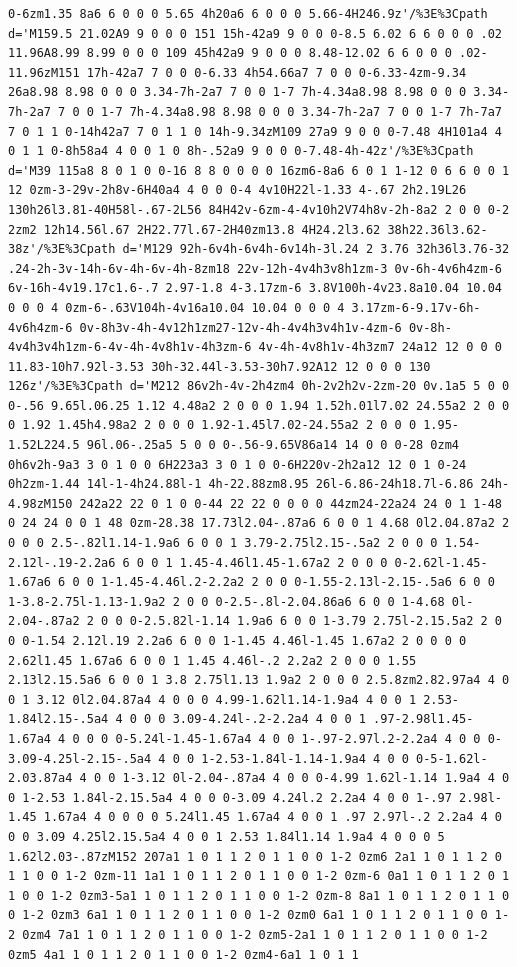 \documentclass[11pt]{article}
\begin{document}
\begin{enumerate}
\begin{verbatim}
0-6zm1.35 8a6 6 0 0 0 5.65 4h20a6 6 0 0 0 5.66-4H246.9z'/%3E%3Cpath d='M159.5 21.02A9 9 0 0 0 151 15h-42a9 9 0 0 0-8.5 6.02 6 6 0 0 0 .02 11.96A8.99 8.99 0 0 0 109 45h42a9 9 0 0 0 8.48-12.02 6 6 0 0 0 .02-11.96zM151 17h-42a7 7 0 0 0-6.33 4h54.66a7 7 0 0 0-6.33-4zm-9.34 26a8.98 8.98 0 0 0 3.34-7h-2a7 7 0 0 1-7 7h-4.34a8.98 8.98 0 0 0 3.34-7h-2a7 7 0 0 1-7 7h-4.34a8.98 8.98 0 0 0 3.34-7h-2a7 7 0 0 1-7 7h-7a7 7 0 1 1 0-14h42a7 7 0 1 1 0 14h-9.34zM109 27a9 9 0 0 0-7.48 4H101a4 4 0 1 1 0-8h58a4 4 0 0 1 0 8h-.52a9 9 0 0 0-7.48-4h-42z'/%3E%3Cpath d='M39 115a8 8 0 1 0 0-16 8 8 0 0 0 0 16zm6-8a6 6 0 1 1-12 0 6 6 0 0 1 12 0zm-3-29v-2h8v-6H40a4 4 0 0 0-4 4v10H22l-1.33 4-.67 2h2.19L26 130h26l3.81-40H58l-.67-2L56 84H42v-6zm-4-4v10h2V74h8v-2h-8a2 2 0 0 0-2 2zm2 12h14.56l.67 2H22.77l.67-2H40zm13.8 4H24.2l3.62 38h22.36l3.62-38z'/%3E%3Cpath d='M129 92h-6v4h-6v4h-6v14h-3l.24 2 3.76 32h36l3.76-32 .24-2h-3v-14h-6v-4h-6v-4h-8zm18 22v-12h-4v4h3v8h1zm-3 0v-6h-4v6h4zm-6 6v-16h-4v19.17c1.6-.7 2.97-1.8 4-3.17zm-6 3.8V100h-4v23.8a10.04 10.04 0 0 0 4 0zm-6-.63V104h-4v16a10.04 10.04 0 0 0 4 3.17zm-6-9.17v-6h-4v6h4zm-6 0v-8h3v-4h-4v12h1zm27-12v-4h-4v4h3v4h1v-4zm-6 0v-8h-4v4h3v4h1zm-6-4v-4h-4v8h1v-4h3zm-6 4v-4h-4v8h1v-4h3zm7 24a12 12 0 0 0 11.83-10h7.92l-3.53 30h-32.44l-3.53-30h7.92A12 12 0 0 0 130 126z'/%3E%3Cpath d='M212 86v2h-4v-2h4zm4 0h-2v2h2v-2zm-20 0v.1a5 5 0 0 0-.56 9.65l.06.25 1.12 4.48a2 2 0 0 0 1.94 1.52h.01l7.02 24.55a2 2 0 0 0 1.92 1.45h4.98a2 2 0 0 0 1.92-1.45l7.02-24.55a2 2 0 0 0 1.95-1.52L224.5 96l.06-.25a5 5 0 0 0-.56-9.65V86a14 14 0 0 0-28 0zm4 0h6v2h-9a3 3 0 1 0 0 6H223a3 3 0 1 0 0-6H220v-2h2a12 12 0 1 0-24 0h2zm-1.44 14l-1-4h24.88l-1 4h-22.88zm8.95 26l-6.86-24h18.7l-6.86 24h-4.98zM150 242a22 22 0 1 0 0-44 22 22 0 0 0 0 44zm24-22a24 24 0 1 1-48 0 24 24 0 0 1 48 0zm-28.38 17.73l2.04-.87a6 6 0 0 1 4.68 0l2.04.87a2 2 0 0 0 2.5-.82l1.14-1.9a6 6 0 0 1 3.79-2.75l2.15-.5a2 2 0 0 0 1.54-2.12l-.19-2.2a6 6 0 0 1 1.45-4.46l1.45-1.67a2 2 0 0 0 0-2.62l-1.45-1.67a6 6 0 0 1-1.45-4.46l.2-2.2a2 2 0 0 0-1.55-2.13l-2.15-.5a6 6 0 0 1-3.8-2.75l-1.13-1.9a2 2 0 0 0-2.5-.8l-2.04.86a6 6 0 0 1-4.68 0l-2.04-.87a2 2 0 0 0-2.5.82l-1.14 1.9a6 6 0 0 1-3.79 2.75l-2.15.5a2 2 0 0 0-1.54 2.12l.19 2.2a6 6 0 0 1-1.45 4.46l-1.45 1.67a2 2 0 0 0 0 2.62l1.45 1.67a6 6 0 0 1 1.45 4.46l-.2 2.2a2 2 0 0 0 1.55 2.13l2.15.5a6 6 0 0 1 3.8 2.75l1.13 1.9a2 2 0 0 0 2.5.8zm2.82.97a4 4 0 0 1 3.12 0l2.04.87a4 4 0 0 0 4.99-1.62l1.14-1.9a4 4 0 0 1 2.53-1.84l2.15-.5a4 4 0 0 0 3.09-4.24l-.2-2.2a4 4 0 0 1 .97-2.98l1.45-1.67a4 4 0 0 0 0-5.24l-1.45-1.67a4 4 0 0 1-.97-2.97l.2-2.2a4 4 0 0 0-3.09-4.25l-2.15-.5a4 4 0 0 1-2.53-1.84l-1.14-1.9a4 4 0 0 0-5-1.62l-2.03.87a4 4 0 0 1-3.12 0l-2.04-.87a4 4 0 0 0-4.99 1.62l-1.14 1.9a4 4 0 0 1-2.53 1.84l-2.15.5a4 4 0 0 0-3.09 4.24l.2 2.2a4 4 0 0 1-.97 2.98l-1.45 1.67a4 4 0 0 0 0 5.24l1.45 1.67a4 4 0 0 1 .97 2.97l-.2 2.2a4 4 0 0 0 3.09 4.25l2.15.5a4 4 0 0 1 2.53 1.84l1.14 1.9a4 4 0 0 0 5 1.62l2.03-.87zM152 207a1 1 0 1 1 2 0 1 1 0 0 1-2 0zm6 2a1 1 0 1 1 2 0 1 1 0 0 1-2 0zm-11 1a1 1 0 1 1 2 0 1 1 0 0 1-2 0zm-6 0a1 1 0 1 1 2 0 1 1 0 0 1-2 0zm3-5a1 1 0 1 1 2 0 1 1 0 0 1-2 0zm-8 8a1 1 0 1 1 2 0 1 1 0 0 1-2 0zm3 6a1 1 0 1 1 2 0 1 1 0 0 1-2 0zm0 6a1 1 0 1 1 2 0 1 1 0 0 1-2 0zm4 7a1 1 0 1 1 2 0 1 1 0 0 1-2 0zm5-2a1 1 0 1 1 2 0 1 1 0 0 1-2 0zm5 4a1 1 0 1 1 2 0 1 1 0 0 1-2 0zm4-6a1 1 0 1 1 
\end{verbatim}
\end{enumerate}
\end{document}
